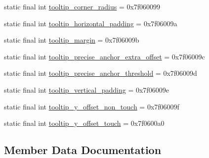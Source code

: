 \begin{DoxyCompactItemize}
\item 
static final int \mbox{\hyperlink{classandroid_1_1support_1_1design_1_1R_1_1dimen_a820af68fce1d51144ee651d2b4745161}{tooltip\+\_\+corner\+\_\+radius}} = 0x7f060099
\item 
static final int \mbox{\hyperlink{classandroid_1_1support_1_1design_1_1R_1_1dimen_a2d5d1251e5fb4877c055140780ccf655}{tooltip\+\_\+horizontal\+\_\+padding}} = 0x7f06009a
\item 
static final int \mbox{\hyperlink{classandroid_1_1support_1_1design_1_1R_1_1dimen_a455cff6e6f3708ce927b07b2aa8fa4b3}{tooltip\+\_\+margin}} = 0x7f06009b
\item 
static final int \mbox{\hyperlink{classandroid_1_1support_1_1design_1_1R_1_1dimen_acf04ff79f1e43192eb04a03f12ee7473}{tooltip\+\_\+precise\+\_\+anchor\+\_\+extra\+\_\+offset}} = 0x7f06009c
\item 
static final int \mbox{\hyperlink{classandroid_1_1support_1_1design_1_1R_1_1dimen_aacffb6610eeb24579fd9d349eb839252}{tooltip\+\_\+precise\+\_\+anchor\+\_\+threshold}} = 0x7f06009d
\item 
static final int \mbox{\hyperlink{classandroid_1_1support_1_1design_1_1R_1_1dimen_a2d61059ec36a5c4f85dd65a2d2a4c4ad}{tooltip\+\_\+vertical\+\_\+padding}} = 0x7f06009e
\item 
static final int \mbox{\hyperlink{classandroid_1_1support_1_1design_1_1R_1_1dimen_a4240fd5708c2da5d2eb045a23cf0b2a7}{tooltip\+\_\+y\+\_\+offset\+\_\+non\+\_\+touch}} = 0x7f06009f
\item 
static final int \mbox{\hyperlink{classandroid_1_1support_1_1design_1_1R_1_1dimen_a7e9207470a7236ed6fade4180fc9eeab}{tooltip\+\_\+y\+\_\+offset\+\_\+touch}} = 0x7f0600a0
\end{DoxyCompactItemize}


\subsection{Member Data Documentation}
\mbox{\label{classandroid_1_1support_1_1design_1_1R_1_1dimen_af42ca9b71c928b25b27c7037a575693b}} 
